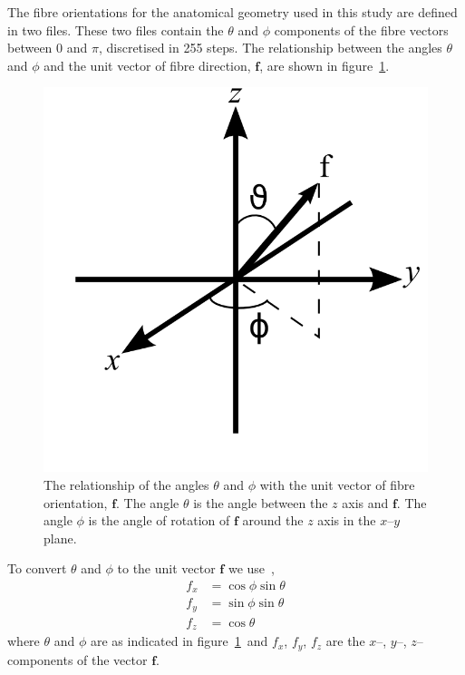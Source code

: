 The fibre orientations for the anatomical geometry used in this study are
defined in two files.
These two files contain the $\theta$ and $\phi$ components of the fibre vectors
between $0$ and $\pi$, discretised in 255 steps.
The relationship between the angles $\theta$ and $\phi$ and the unit vector of fibre
direction, $\mathbf{f}$, are shown in
figure~\ref{fig:atrium:structure:unit_vector}.
\begin{figure}
\begin{center}
\includegraphics{figures/atrium/structure/unit_vector}
\end{center}
\caption[Relationship of $\theta$, $\phi$ and $\mathbf{f}$]{
\label{fig:atrium:structure:unit_vector}
The relationship of the angles $\theta$ and $\phi$ with the unit vector of fibre
orientation, $\mathbf{f}$.
The angle $\theta$ is the angle between the $z$ axis and $\mathbf{f}$.
The angle $\phi$ is the angle of rotation of $\mathbf{f}$ around the $z$ axis in
the $x\text{--}y$ plane.
}
\end{figure}
To convert $\theta$ and $\phi$ to the unit vector $\mathbf{f}$ we
use~\cite{Misner1973},
\begin{subequations}\label{eqn:atrium:structure:anglestof}
\begin{align}
f_x &= \cos\phi \sin\theta \label{eqn:atrium:structure:anglestofx}\\
f_y &= \sin\phi \sin\theta\label{eqn:atrium:structure:anglestofy}\\
f_z &= \cos\theta\label{eqn:atrium:structure:anglestofz}
\end{align}
\end{subequations}
where $\theta$ and $\phi$ are as indicated in
figure~\ref{fig:atrium:structure:unit_vector}\ and $f_x$, $f_y$, $f_z$ are the
$x$--, $y$--, $z$-- components of the vector $\mathbf{f}$.





